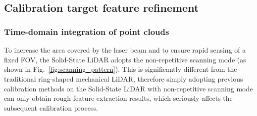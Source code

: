 \documentclass[journal]{vgtc}
\begin{document}
\begin{figure*}[!htb]
	\centering
	\vspace{-0.3cm}
	\\
	\vspace{-0.3cm}
	\\
	\caption{The integrated point clouds on a plane checkerboard from non-repetitive scanning Solid-State LiDAR at different distances (left: front view; right: side view). $d$ denotes the distance between the checkerboard center and LiDAR, and the unit of the $x$ and $y$ axis in each subplot is $m$. The noise is affected by both the distance and surface color of the object, and is more obvious in the side views.}
	\label{fig:scanning_pattern} 
\end{figure*}




\subsection{Calibration target feature refinement}
\label{sec:feature_refinement}

\subsubsection{Time-domain integration of point clouds}
To increase the area covered by the laser beam and to ensure rapid sensing of a fixed FOV, the Solid-State LiDAR adopts the non-repetitive scanning mode (as shown in Fig.~\ref{fig:scanning_pattern}). This is significantly different from the traditional ring-shaped mechanical LiDAR, therefore simply adopting previous calibration methods on the Solid-State LiDAR with non-repetitive scanning mode can only obtain rough feature extraction results, which seriously affects the subsequent calibration process.
\end{document}
